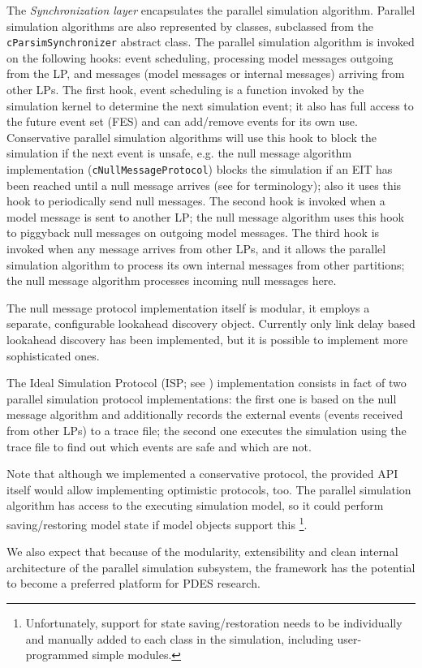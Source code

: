 The \textit{Synchronization layer} encapsulates the parallel
simulation algorithm. Parallel simulation algorithms are also represented
by classes, subclassed from the \texttt{cParsimSynchronizer} abstract class.
The parallel simulation algorithm is invoked on the following hooks:
event scheduling, processing model messages outgoing from the LP,
and messages (model messages or internal messages) arriving
from other LPs. The first hook, event scheduling is a function
invoked by the simulation kernel to determine the next simulation
event; it also has full access to the future event set (FES) and
can add/remove events for its own use.
Conservative parallel simulation algorithms will use this hook
to block the simulation if the next event is unsafe, e.g. the
null message algorithm implementation (\texttt{cNullMessageProtocol})
blocks the simulation if an EIT has been reached until a null message
arrives (see \cite{bagrodia00} for terminology); also it uses
this hook to periodically send null messages. The second hook
is invoked when a model message is sent to another LP;
the null message algorithm uses this hook to piggyback null
messages on outgoing model messages. The third hook is invoked
when any message arrives from other LPs, and it allows the
parallel simulation algorithm to process its own internal messages
from other partitions; the null message algorithm processes
incoming null messages here.

The null message protocol implementation itself is modular,
it employs a separate, configurable lookahead discovery object.
Currently only link delay based lookahead discovery has been
implemented, but it is possible to implement more sophisticated
ones.

The Ideal Simulation Protocol (ISP; see \cite{bagrodia00})
implementation consists in fact of two parallel simulation
protocol implementations:
the first one is based on the null message algorithm and
additionally records the external events (events received
from other LPs) to a trace file; the second one executes
the simulation using the trace file to find out which
events are safe and which are not.

Note that although we implemented a conservative protocol,
the provided API itself would allow implementing optimistic
protocols, too. The parallel simulation algorithm has
access to the executing simulation model, so it could perform
saving/restoring model state if model objects support this
  \footnote{Unfortunately, support for state saving/restoration
  needs to be individually and manually added to each class
  in the simulation, including user-programmed simple modules.}.

We also expect that because of the modularity, extensibility and
clean internal architecture of the parallel simulation subsystem,
the {\opp} framework has the potential to become a preferred platform
for PDES research.


